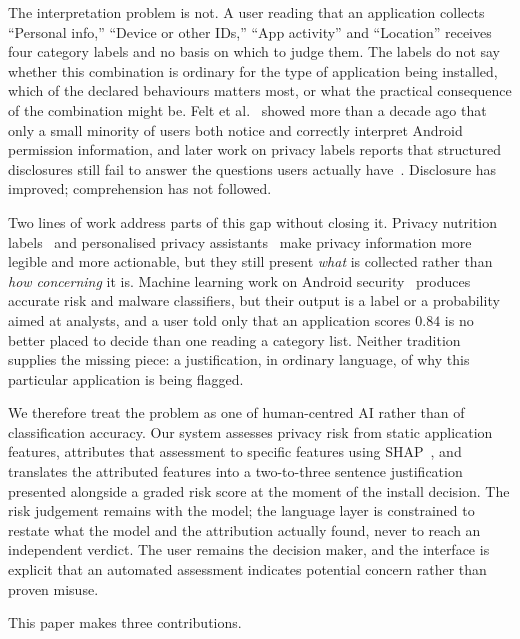 \documentclass[sigconf]{acmart}
\begin{document}
The interpretation problem is not. A user reading that an application
collects ``Personal info,'' ``Device or other IDs,'' ``App activity'' and
``Location'' receives four category labels and no basis on which to judge
them. The labels do not say whether this combination is ordinary for the
type of application being installed, which of the declared behaviours
matters most, or what the practical consequence of the combination might
be. Felt et al.~\cite{felt2012permissions} showed more than a decade ago
that only a small minority of users both notice and correctly interpret
Android permission information, and later work on privacy labels reports
that structured disclosures still fail to answer the questions users
actually have~\cite{zhang2022datasafety}. Disclosure has improved;
comprehension has not followed.

Two lines of work address parts of this gap without closing it. Privacy
nutrition labels~\cite{kelley2009nutrition} and personalised privacy
assistants~\cite{liu2016privacyassistant} make privacy information more
legible and more actionable, but they still present \emph{what} is
collected rather than \emph{how concerning} it is. Machine learning work on
Android security~\cite{arp2014drebin, wang2014permissionrisk,
yerima2019droidfusion} produces accurate risk and malware classifiers, but
their output is a label or a probability aimed at analysts, and a user told
only that an application scores $0.84$ is no better placed to decide than
one reading a category list. Neither tradition supplies the missing piece: a
justification, in ordinary language, of why this particular application is
being flagged.

We therefore treat the problem as one of human-centred AI rather than of
classification accuracy. Our system assesses privacy risk from static
application features, attributes that assessment to specific features using
SHAP~\cite{lundberg2017shap}, and translates the attributed features into a
two-to-three sentence justification presented alongside a graded risk score
at the moment of the install decision. The risk judgement remains with the
model; the language layer is constrained to restate what the model and the
attribution actually found, never to reach an independent verdict. The user
remains the decision maker, and the interface is explicit that an automated
assessment indicates potential concern rather than proven misuse.

This paper makes three contributions.
\end{document}

